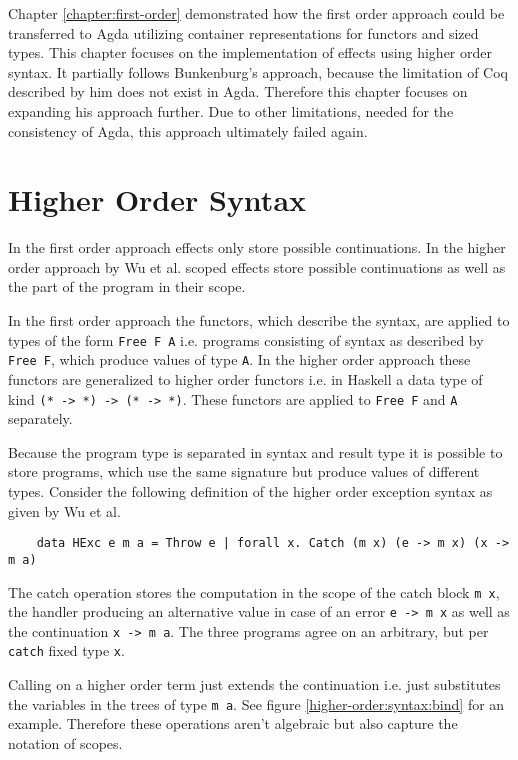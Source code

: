 Chapter \ref{chapter:first-order} demonstrated how the first order approach
could be transferred to Agda utilizing container representations for functors
and sized types.
This chapter focuses on the implementation of effects using higher order syntax.
It partially follows Bunkenburg's approach, because the limitation of Coq
described by him does not exist in Agda.
Therefore this chapter focuses on expanding his approach further.
Due to other limitations, needed for the consistency of Agda, this approach
ultimately failed again.


\section{Higher Order Syntax}

In the first order approach effects only store possible continuations.
In the higher order approach by Wu et al. scoped effects store possible
continuations as well as the part of the program in their scope.

In the first order approach the functors, which describe the syntax, are applied
to types of the form \texttt{Free F A} i.e. programs consisting of syntax as
described by \texttt{Free F}, which produce values of type \texttt{A}.
In the higher order approach these functors are generalized to higher order
functors i.e. in Haskell a data type of kind \texttt{(* -> *) -> (* -> *)}.
These functors are applied to \texttt{Free F} and \texttt{A} separately.

Because the program type is separated in syntax and result type it is possible
to store programs, which use the same signature but produce values of different
types.
Consider the following definition of the higher order exception syntax as given
by Wu et al.

\begin{verbatim}
    data HExc e m a = Throw e | forall x. Catch (m x) (e -> m x) (x -> m a)
\end{verbatim}
The catch operation stores the computation in the scope of the catch block
\texttt{m x}, the handler producing an alternative value in case of an error
\texttt{e -> m x} as well as the continuation \texttt{x -> m a}.
The three programs agree on an arbitrary, but per \texttt{catch} fixed type
\texttt{x}.

Calling \AgdaFunction{>>=} on a higher order term just extends the continuation
i.e. just substitutes the variables in the trees of type \texttt{m a}.
See figure \ref{higher-order:syntax:bind} for an example.
Therefore these operations aren't algebraic but also capture the notation of
scopes.


